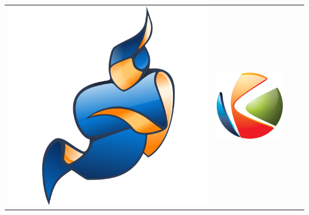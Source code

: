 \documentclass[compress]{beamer}
\begin{document}
\begin{frame}[c]
\begin{table}[]
\begin{tabular}{cccc}
 \begin{minipage}{.2\textwidth}\includegraphics[width=\linewidth]{figures/jitsi.png}\end{minipage} &  
 \begin{minipage}{.2\textwidth}\includegraphics[width=\linewidth]{figures/kurento.png}\end{minipage} \\

\end{tabular}
\end{table}
\end{frame}
\end{document}

